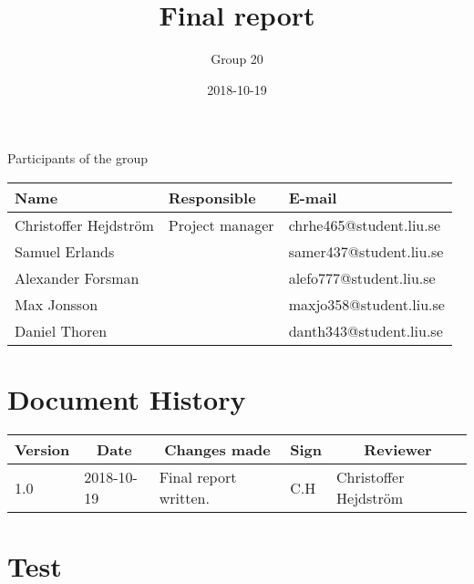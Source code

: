 \documentclass[10pt,oneside,english]{lips}
\title{Final report}
\author{Group 20}
\date{2018-10-19}
\begin{document}
  \setlength\parindent{0pt}
  \maketitle
  
  \cleardoublepage
  \makeprojectid
  
  \begin{center}
    \Large Participants of the group
  \end{center}
  \begin{center}
    \begin{tabular}{|l|l|l|}
      \hline
      \textbf{Name} & \textbf{Responsible} & \textbf{E-mail}\\ \hline
      Christoffer Hejdström & Project manager & chrhe465@student.liu.se \\ \hline
      Samuel Erlands & & samer437@student.liu.se \\ \hline
      Alexander Forsman & & alefo777@student.liu.se\\ \hline
      Max Jonsson & & maxjo358@student.liu.se\\ \hline
      Daniel Thoren & & danth343@student.liu.se\\
      \hline
    \end{tabular}
  \end{center}
  
  
  \cleardoublepage
  \tableofcontents
  
  \cleardoublepage
  \section*{Document History}
  \begin{tabular}{p{}|p{}|p{}|p{}|p{}} 
    \multicolumn{1}{c}{\bfseries Version} & 
    \multicolumn{1}{|c}{\bfseries Date} & 
    \multicolumn{1}{|c}{\bfseries Changes made} & 
    \multicolumn{1}{|c}{\bfseries Sign} & 
    \multicolumn{1}{|c}{\bfseries Reviewer}\\
    \hline
    \hline
    1.0 & 2018-10-19 & Final report written. & C.H & Christoffer Hejdström \\ \hline
  \end{tabular}
  
  \cleardoublepage
  \cfoot{\thepage}
  
  \section{Test}
  
  \clearpage
  
  \cleardoublepage
  \appendix
  
  
\end{document}

